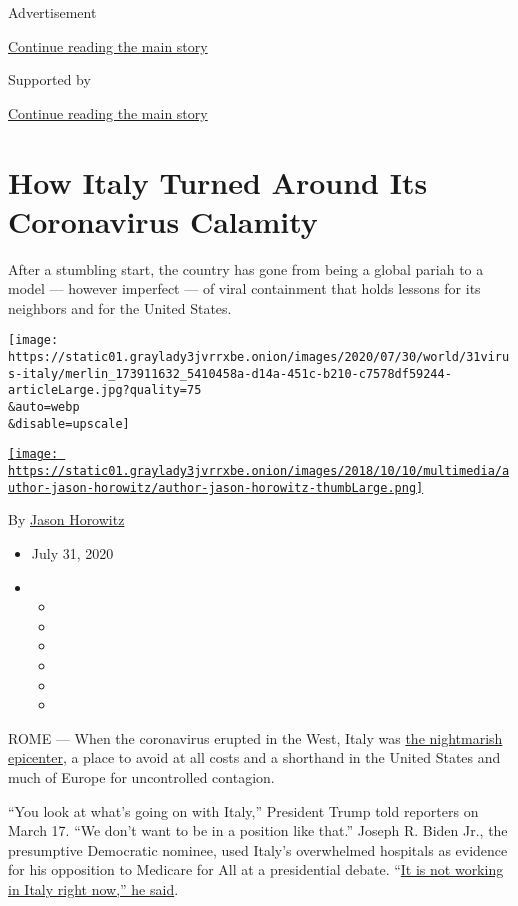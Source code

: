 Advertisement

\protect\hyperlink{after-top}{Continue reading the main story}

Supported by

\protect\hyperlink{after-sponsor}{Continue reading the main story}

\hypertarget{how-italy-turned-around-its-coronavirus-calamity}{%
\section{How Italy Turned Around Its Coronavirus
Calamity}\label{how-italy-turned-around-its-coronavirus-calamity}}

After a stumbling start, the country has gone from being a global pariah
to a model --- however imperfect --- of viral containment that holds
lessons for its neighbors and for the United States.

\texttt{[image: https://static01.graylady3jvrrxbe.onion/images/2020/07/30/world/31virus-italy/merlin\_173911632\_5410458a-d14a-451c-b210-c7578df59244-articleLarge.jpg?quality=75\\\&auto=webp\\\&disable=upscale]}

\href{https://www.nytimes3xbfgragh.onion/by/jason-horowitz}{\texttt{[image: https://static01.graylady3jvrrxbe.onion/images/2018/10/10/multimedia/author-jason-horowitz/author-jason-horowitz-thumbLarge.png]}}

By \href{https://www.nytimes3xbfgragh.onion/by/jason-horowitz}{Jason
Horowitz}

\begin{itemize}
\item
  July 31, 2020
\item
  \begin{itemize}
  \item
  \item
  \item
  \item
  \item
  \item
  \end{itemize}
\end{itemize}

ROME --- When the coronavirus erupted in the West, Italy was
\href{https://www.nytimes3xbfgragh.onion/interactive/2020/03/27/world/europe/coronavirus-italy-bergamo.html}{the
nightmarish epicenter}, a place to avoid at all costs and a shorthand in
the United States and much of Europe for uncontrolled contagion.

``You look at what's going on with Italy,'' President Trump told
reporters on March 17. ``We don't want to be in a position like that.''
Joseph R. Biden Jr., the presumptive Democratic nominee, used Italy's
overwhelmed hospitals as evidence for his opposition to Medicare for All
at a presidential debate.
``\href{https://edition.cnn.com/politics/live-news/2020-democratic-debate-live-updates/h_501d1e381370480bd021916a86029534}{It
is not working in Italy right now,'' he said}.

